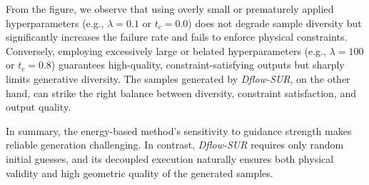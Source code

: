 From the figure, we observe that using overly small or prematurely applied hyperparameters (e.g., $\lambda = 0.1$ or $t_c = 0.0$) does not degrade sample diversity but significantly increases the failure rate and fails to enforce physical constraints. Conversely, employing excessively large or belated hyperparameters (e.g., $\lambda = 100$ or $t_c = 0.8$) guarantees high-quality, constraint-satisfying outputs but sharply limits generative diversity. The samples generated by \textit{Dflow-SUR}, on the other hand, can strike the right balance between diversity, constraint satisfaction, and output quality.

In summary, the energy-based method’s sensitivity to guidance strength makes reliable generation challenging. In contrast, \textit{Dflow-SUR} requires only random initial guesses, and its decoupled execution naturally ensures both physical validity and high geometric quality of the generated samples.
